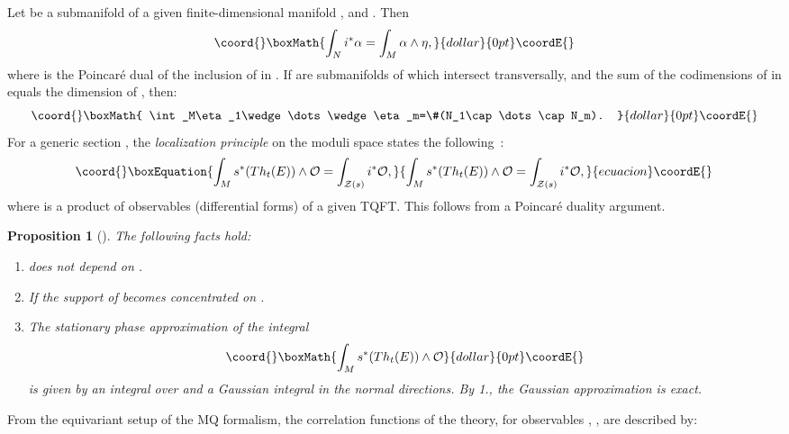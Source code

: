 \documentclass[a4paper,12pt,reqno,sumlimits]{amsart}
\theoremstyle{plain}
\newtheorem{prop}[thm]{Proposition}
\theoremstyle{definition}
\providecommand{\1}{{\bf 1}}
\providecommand{\calO}{{\mathcal O}}
\providecommand{\calZ}{{\mathcal Z}}
\renewcommand{\to}{\longrightarrow}
\providecommand{\inc}{\hookrightarrow}
\numberwithin{equation}{section}
\begin{document}
Let \myHighlight{$N\stackrel{i}{\inc}M$}\coordHE{} be a submanifold of a given finite-dimensional
manifold \coordHE{}, and \coordHE{}. Then
$$\coord{}\boxMath{
\int_N i^*\alpha=\int_M\alpha\wedge\eta,
}{dollar}{0pt}\coordE{}$$
where \myHighlight{$\eta$}\coordHE{} is the Poincar\'e dual of the inclusion of \coordHE{} in \coordHE{}.  If
\coordHE{} are \coordHE{} submanifolds of \coordHE{} which intersect transversally,
and the sum of the codimensions of \coordHE{} in \coordHE{} equals the dimension of \coordHE{},
then:
$$\coord{}\boxMath{
\int_M\eta_1\wedge\dots\wedge\eta_m=\#(N_1\cap\dots\cap N_m).
}{dollar}{0pt}\coordE{}$$
For a generic section \coordHE{}, the {\em localization principle} on the moduli
space \myHighlight{$\calZ(s)$}\coordHE{} states the following~\cite{cordes}:
\begin{equation}\coord{}\boxEquation{
  \label{locmodulispace}
  \int_M s^*(Th_t(E))\wedge\calO=\int_{\calZ(s)}i^*\calO,
}{
  \int_M s^*(Th_t(E))\wedge\calO=\int_{\calZ(s)}i^*\calO,
}{ecuacion}\coordE{}\end{equation}
where \myHighlight{$\calO$}\coordHE{} is a product of observables (differential forms) of a given
TQFT.  This follows from a Poincar\'e duality argument.
\begin{prop}[\cite{cordes}]
  The following facts hold:
  \begin{enumerate}
  \item {}\coordHE{} does not depend on \coordHE{}.
  \item If \myHighlight{$t\to 0$}\coordHE{} the support of \coordHE{} becomes concentrated on
    \myHighlight{$\calZ(s)$}\coordHE{}. 
  \item The stationary phase approximation of the integral
    $$\coord{}\boxMath{
    \int_M s^*(Th_t(E))\wedge\calO
    }{dollar}{0pt}\coordE{}$$
    is given by an integral over \myHighlight{$\calZ(s)$}\coordHE{} and a Gaussian integral in the
    normal directions. By {\em 1.}, the Gaussian approximation is exact.
  \end{enumerate}
\end{prop}
From the equivariant setup of the MQ formalism, the correlation functions of
the theory, for observables \myHighlight{$\calO_i$}\coordHE{}, \coordHE{}, are described by:
\end{document}
